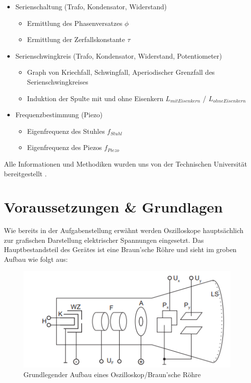 \documentclass[12pt,a4paper,twoside]{article}
\begin{document}
\begin{itemize}
    \item Serienschaltung (Trafo, Kondensator, Widerstand)
    \begin{itemize}
        \item Ermittlung des Phasenversatzes $\phi$
        \item Ermittlung der Zerfallskonstante $\tau$
    \end{itemize}
    \item Serienschwingkreis (Trafo, Kondensator, Widerstand, Potentiometer)
    \begin{itemize}
        \item Graph von Kriechfall, Schwingfall, Aperiodischer Grenzfall des Serienschwingkreises
        \item Induktion der Spulte mit und ohne Eisenkern $L_{mitEisenkern}$ / $L_{ohneEisenkern}$
    \end{itemize}
    \item Frequenzbestimmung (Piezo)
    \begin{itemize}
        \item Eigenfrequenz des Stuhles $f_{Stuhl}$
        \item Eigenfrequenz des Piezos $f_{Piezo}$
    \end{itemize}
\end{itemize}

\noindent
Alle Informationen und Methodiken wurden uns von der Technischen Universität bereitgestellt \cite{teachcenter1}. 



\section{Voraussetzungen \& Grundlagen} %

Wie bereits in der Aufgabenstellung erwähnt werden Oszilloskope hauptsächlich zur grafischen Darstellung elektrischer Spannungen eingesetzt.  
Das Hauptbestandsteil des Gerätes ist eine Braun'sche Röhre und sieht im groben Aufbau wie folgt aus:

\begin{figure}[H]
    \centering
    \includegraphics[width=0.5\linewidth]{nudes/OszilloskopAufbau.png}
    \caption{Grundlegender Aufbau eines Oszilloskop/Braun'sche Röhre \cite{teachcenter1}}
    \label{fig:Aufbau Oszilloskop}
\end{figure}
\end{document}
